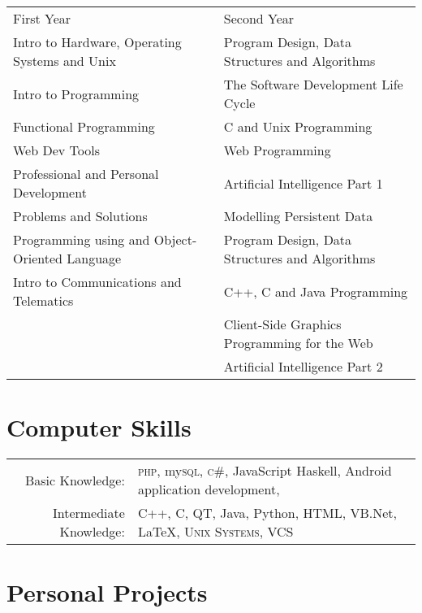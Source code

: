 \documentclass[a4paper,10pt]{article}
\begin{document}
\begin{tabular}{l|l}
First Year & Second Year 
\\
\footnotesize{}Intro to Hardware, Operating Systems and Unix & \footnotesize{}Program Design, Data Structures and Algorithms 
\\
\footnotesize{}Intro to Programming & \footnotesize{}The Software Development Life Cycle
\\
\footnotesize{}Functional Programming & \footnotesize{}C and Unix Programming
\\
\footnotesize{}Web Dev Tools &\footnotesize{}Web Programming 
\\
\footnotesize{}Professional and Personal Development & \footnotesize{}Artificial Intelligence Part 1
\\
\footnotesize{}Problems and Solutions & \footnotesize{}Modelling Persistent Data
\\
\footnotesize{}Programming using and Object-Oriented Language  & \footnotesize{}Program Design, Data Structures and Algorithms
\\
\footnotesize{}Intro to Communications and Telematics & \footnotesize{}C++, C and Java Programming
\\
& \footnotesize{}Client-Side Graphics Programming for the Web 
\\
& \footnotesize{}Artificial Intelligence Part 2 



\end{tabular}

\section{Computer Skills}
\begin{tabular}{rl}
 Basic Knowledge:& \textsc{php}, my\textsc{sql}, \textsc{c\#}, JavaScript Haskell, Android application development,  \\
Intermediate Knowledge:& C++, C, QT, Java, Python, HTML, VB.Net, \LaTeX, \textsc{Unix Systems}, VCS
\end{tabular}
\par 
 
\section{Personal Projects }
\end{document}
